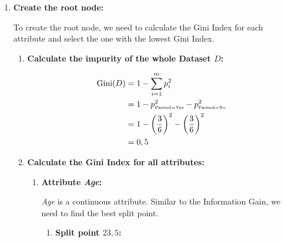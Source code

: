 \documentclass[
english,
smallborders
]{i6prcsht}
\newcommand{\OfSpecificValue}[3]{_{\text{\tiny #1#2#3}}}
\begin{document}
\begin{solution}
	\begin{enumerate}
		\item \textbf{Create the root node:}

		      To create the root node, we need to calculate the Gini Index for each attribute and select the one with the lowest Gini Index.

		      \begin{enumerate}
			      \item \textbf{Calculate the impurity of the whole Dataset $D$:}

			            \begin{alignat*}{2}
				            \text{Gini}(D) & = 1 - \sum_{i=1}^{m}p_i^2                                                      \\
				                           & = 1 - p\OfSpecificValue{Passed}{=}{Yes}^2 - p\OfSpecificValue{Passed}{=}{No}^2 \\
				                           & = 1 - \left(\frac{3}{6}\right)^2 - \left(\frac{3}{6}\right)^2                  \\
				                           & = 0,5                                                                          \\
			            \end{alignat*}

			      \item \textbf{Calculate the Gini Index for all attributes:}

			            \begin{enumerate}
				            \item \textbf{Attribute \textit{Age}:}

				                  \textit{Age} is a continuous attribute. Similar to the Information Gain, we need to find the best split point.

				                  \begin{enumerate}
					                  \item \textbf{Split point $23,5$:}


\end{enumerate}
\end{enumerate}
\end{enumerate}
\end{enumerate}
\end{solution}
\end{document}
